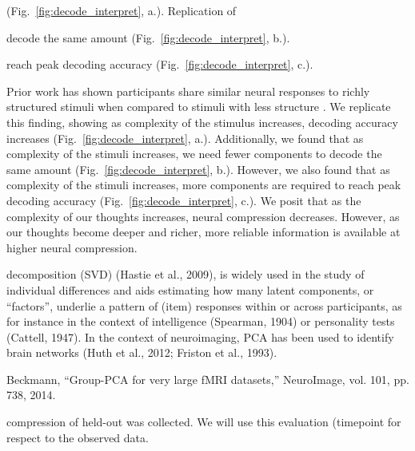 (Fig.~\ref{fig:decode_interpret}, a.). Replication of %

decode the same amount (Fig.~\ref{fig:decode_interpret}, b.).

reach peak decoding accuracy (Fig.~\ref{fig:decode_interpret}, c.).




Prior work has shown participants share similar neural responses to richly
structured stimuli when compared to stimuli with less structure
\cite{SimoEtal16}. We replicate this finding, showing as complexity of the
stimulus increases, decoding accuracy increases
(Fig.~\ref{fig:decode_interpret}, a.). Additionally, we found that as
complexity of the stimuli increases, we need fewer components to decode the
same amount (Fig.~\ref{fig:decode_interpret}, b.). However, we also found that
as complexity of the stimuli increases, more components are required to reach
peak decoding accuracy (Fig.~\ref{fig:decode_interpret}, c.). We posit that as
the complexity of our thoughts increases, neural compression decreases.
However, as our thoughts become deeper and richer, more reliable information is
available at higher neural compression.


decomposition (SVD) (Hastie et al., 2009), is widely used in the study of
individual differences and aids estimating how many latent components, or
“factors”, underlie a pattern of (item) responses within or across
participants, as for instance in the context of intelligence (Spearman, 1904)
or personality tests (Cattell, 1947). In the context of neuroimaging, PCA has
been used to identify brain networks (Huth et al., 2012; Friston et al., 1993).

Beckmann, “Group-PCA for very large fMRI datasets,” NeuroImage, vol. 101, pp.
738, 2014.


compression of held-out %
was collected. We will use this evaluation (timepoint %
for %
respect to the observed data.



